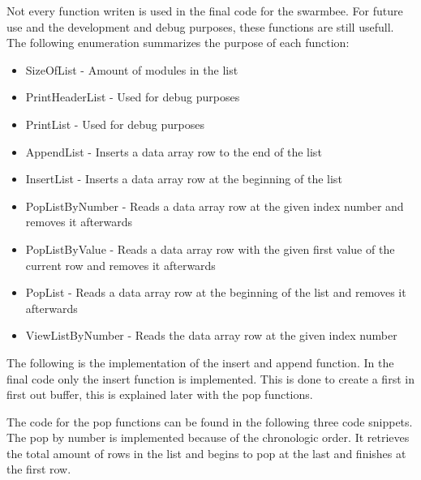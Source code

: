 \documentclass[10pt,a4paper]{article}
\begin{document}
Not every function writen is used in the final code for the swarmbee. For future use and the development and debug purposes, these functions are still usefull. The following enumeration summarizes the purpose of each function:
\begin{itemize}
\setlength\itemsep{0em}
    \item SizeOfList - Amount of modules in the list
    \item PrintHeaderList - Used for debug purposes
    \item PrintList - Used for debug purposes
    \item AppendList - Inserts a data array row to the end of the list
    \item InsertList - Inserts a data array row at the beginning of the list
    \item PopListByNumber - Reads a data array row at the given index number and removes it afterwards
    \item PopListByValue - Reads a data array row with the given first value of the current row and removes it afterwards
    \item PopList - Reads a data array row at the beginning of the list and removes it afterwards
    \item ViewListByNumber - Reads the data array row at the given index number
\end{itemize}

The following is the implementation of the insert and append function. In the final code only the insert function is implemented. This is done to create a first in first out buffer, this is explained later with the pop functions.





The code for the pop functions can be found in the following three code snippets. The pop by number is implemented because of the chronologic order. It retrieves the total amount of rows in the list and begins to pop at the last and finishes at the first row.





\end{document}
